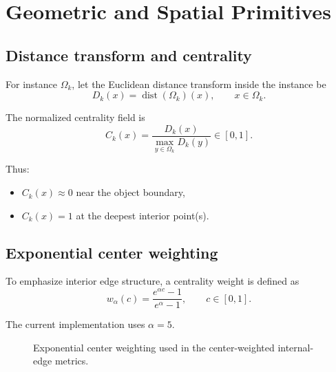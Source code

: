 \documentclass[11pt]{article}
\newcommand{\1}{\mathbf{1}}
\newcommand{\dist}{\operatorname{dist}}
\begin{document}
\section{Geometric and Spatial Primitives}
\subsection{Distance transform and centrality}
For instance $\Omega_k$, let the Euclidean distance transform inside the instance be
\begin{equation}
D_k(x) = \dist(\Omega_k)(x), \qquad x\in\Omega_k.
\end{equation}

The normalized centrality field is
\begin{equation}
C_k(x) = \frac{D_k(x)}{\max_{y\in\Omega_k} D_k(y)} \in [0,1].
\end{equation}

Thus:
\begin{itemize}[leftmargin=1.5em]
  \item $C_k(x)\approx 0$ near the object boundary,
  \item $C_k(x)=1$ at the deepest interior point(s).
\end{itemize}

\subsection{Exponential center weighting}
To emphasize interior edge structure, a centrality weight is defined as
\begin{equation}
w_{\alpha}(c)=\frac{e^{\alpha c}-1}{e^{\alpha}-1}, \qquad c\in[0,1].
\end{equation}

The current implementation uses $\alpha=5$.

\begin{figure}[H]
\centering
{}
\caption{Exponential center weighting used in the center-weighted internal-edge metrics.}
\end{figure}
\end{document}
